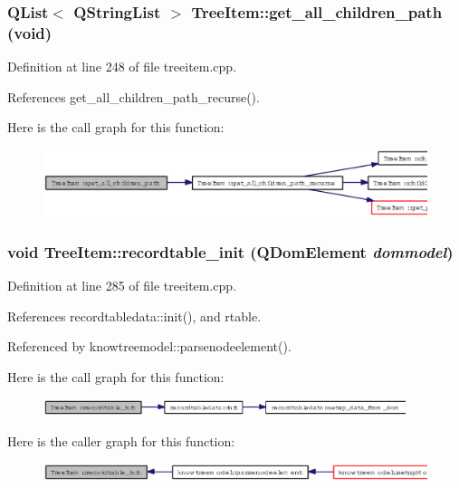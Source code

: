 \subsubsection{\setlength{\rightskip}{0pt plus 5cm}QList$<$ QString\-List $>$ Tree\-Item::get\_\-all\_\-children\_\-path (void)}\label{classTreeItem_cd5987be73e4cd3a16003b6bad3f1e67}




Definition at line 248 of file treeitem.cpp.

References get\_\-all\_\-children\_\-path\_\-recurse().

Here is the call graph for this function:\begin{figure}[H]
\begin{center}
\leavevmode
\includegraphics[width=318pt]{classTreeItem_cd5987be73e4cd3a16003b6bad3f1e67_cgraph}
\end{center}
\end{figure}
\subsubsection{\setlength{\rightskip}{0pt plus 5cm}void Tree\-Item::recordtable\_\-init (QDom\-Element {\em dommodel})}\label{classTreeItem_9f44b2a7b41bc5f791cc25732e41cae6}




Definition at line 285 of file treeitem.cpp.

References recordtabledata::init(), and rtable.

Referenced by knowtreemodel::parsenodeelement().

Here is the call graph for this function:\begin{figure}[H]
\begin{center}
\leavevmode
\includegraphics[width=300pt]{classTreeItem_9f44b2a7b41bc5f791cc25732e41cae6_cgraph}
\end{center}
\end{figure}


Here is the caller graph for this function:\begin{figure}[H]
\begin{center}
\leavevmode
\includegraphics[width=324pt]{classTreeItem_9f44b2a7b41bc5f791cc25732e41cae6_icgraph}
\end{center}
\end{figure}
